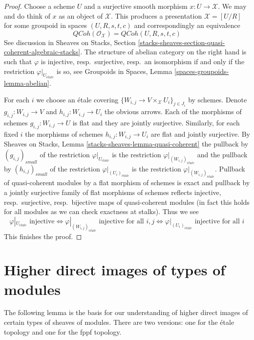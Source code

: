 \documentclass{stacks-project}
\theoremstyle{plain}
\theoremstyle{definition}
\theoremstyle{remark}
\numberwithin{equation}{subsection}
\def\etale{{\acute{e}tale}}
\def\QCoh{\mathit{QCoh}}
\begin{document}
\begin{proof}
Choose a scheme $U$ and a surjective smooth morphism
$x : U \to \mathcal{X}$. We may and do think of $x$
as an object of $\mathcal{X}$.
This produces a presentation $\mathcal{X} = [U/R]$ for some groupoid
in spaces $(U, R, s, t, c)$ and correspondingly an equivalence
$$
\QCoh(\mathcal{O}_\mathcal{X}) = \QCoh(U, R, s, t, c)
$$
See discussion in Sheaves on Stacks, Section
\ref{stacks-sheaves-section-quasi-coherent-algebraic-stacks}.
The structure of abelian category on the right hand is such that $\varphi$
is injective, resp.\ surjective, resp.\ an isomorphism
if and only if the restriction $\varphi|_{U_\etale}$ is so, see
Groupoids in Spaces, Lemma \ref{spaces-groupoids-lemma-abelian}.

\medskip\noindent
For each $i$ we choose an \'etale covering
$\{W_{i, j} \to V \times_\mathcal{X} U_i\}_{j \in J_i}$
by schemes. Denote $g_{i, j} : W_{i, j} \to V$ and
$h_{i, j} : W_{i, j} \to U_i$ the obvious arrows.
Each of the morphisms of schemes $g_{i, j} : W_{i, j} \to U$ is flat
and they are jointly surjective.
Similarly, for each fixed $i$ the morphisms of schemes
$h_{i, j} : W_{i, j} \to U_i$ are flat and jointly surjective.
By Sheaves on Stacks, Lemma \ref{stacks-sheaves-lemma-quasi-coherent}
the pullback by $(g_{i, j})_{small}$ of the restriction
$\varphi|_{U_\etale}$ is the restriction $\varphi|_{(W_{i, j})_\etale}$
and the pullback by $(h_{i, j})_{small}$ of the restriction
$\varphi|_{(U_i)_\etale}$ is the restriction $\varphi|_{(W_{i, j})_\etale}$.
Pullback of quasi-coherent modules by a flat morphism of schemes is exact
and pullback by a jointly surjective family of flat morphisms of schemes
reflects injective, resp.\ surjective, resp.\ bijective maps
of quasi-coherent modules (in fact this holds for all modules
as we can check exactness at stalks). Thus we see
$$
\varphi|_{U_\etale} \text{ injective}
\Leftrightarrow
\varphi|_{(W_{i, j})_\etale} \text{ injective for all }i, j
\Leftrightarrow
\varphi|_{(U_i)_\etale} \text{ injective for all }i
$$
This finishes the proof.
\end{proof}




\section{Higher direct images of types of modules}
\label{section-key}

\noindent
The following lemma is the basis for our understanding of
higher direct images of certain types of sheaves of modules.
There are two versions: one for the \'etale topology and
one for the fppf topology.
\end{document}
